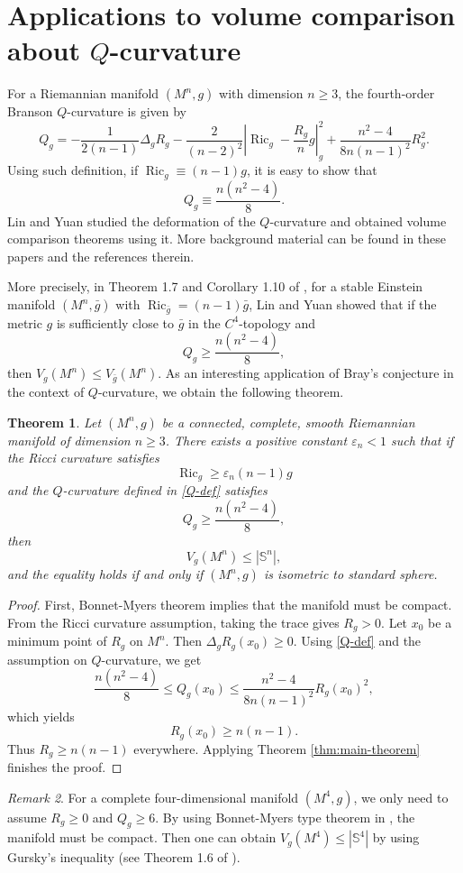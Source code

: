 \documentclass[11pt, reqno]{amsart}
\numberwithin{equation}{section}
\newtheorem{theorem}{Theorem}[section]
\theoremstyle{remark}
\newtheorem{remark}[theorem]{Remark}
\begin{document}
\section{Applications to  volume comparison about $Q$-curvature}\label{sec:application}


For a Riemannian manifold $(M^n,g)$ with dimension $n\geq 3$, the fourth-order Branson $Q$-curvature is given by
\begin{equation}\label{Q-def}
    Q_g=-\frac{1}{2(n-1)}\Delta_gR_g-\frac{2}{(n-2)^2}\left|\operatorname{Ric}_g-\frac{R_g}{n}g\right|_g^2+\frac{n^2-4}{8n(n-1)^2}R_g^2.
\end{equation}
Using such definition, if $\operatorname{Ric}_g\equiv (n-1)g$, it is easy to show that
$$
Q_g\equiv \frac{n(n^2-4)}{8}.
$$
Lin and Yuan \cite{LinYuan1,LinYuan2} studied the deformation of the $Q$-curvature and obtained volume comparison theorems using it. More background material can be found in these papers and the references therein.

More precisely, in Theorem 1.7 and Corollary 1.10 of \cite{LinYuan2}, for a stable Einstein manifold $(M^n,\bar g)$ with $\operatorname{Ric}_{\bar g}=(n-1)\bar g$, Lin and Yuan showed that if the metric $g$ is sufficiently close to $\bar g$ in the $C^4$-topology and
$$
Q_g\geq \frac{n(n^2-4)}{8},
$$
then $V_g(M^n)\leq V_{\bar g}(M^n)$. As an interesting application of Bray's conjecture in the context of $Q$-curvature, we obtain the following theorem.

\begin{theorem}
Let $(M^n,g)$ be a connected, complete, smooth Riemannian manifold of dimension $n\geq 3$. There exists a positive constant $\varepsilon_n<1$ such that if the Ricci curvature satisfies
$$
\operatorname{Ric}_g\geq \varepsilon_n (n-1)g
$$
and the $Q$-curvature defined in \eqref{Q-def} satisfies
$$
Q_g\geq \frac{n(n^2-4)}{8},
$$
then
$$
V_g(M^n)\leq |\mathbb{S}^n|,
$$
and the equality holds if and only if $(M^n, g)$ is isometric to standard sphere.
\end{theorem}

\begin{proof}
First, Bonnet-Myers theorem implies that the manifold must be compact.
From the Ricci curvature assumption, taking the trace gives $R_g>0$. Let $x_0$ be a minimum point of $R_g$ on $M^n$. Then $\Delta_g R_g(x_0)\geq 0$. Using \eqref{Q-def} and the assumption on $Q$-curvature, we get
$$
\frac{n(n^2-4)}{8}\leq Q_g(x_0)\leq \frac{n^2-4}{8n(n-1)^2}R_g(x_0)^2,
$$
which yields
$$
R_g(x_0)\geq n(n-1).
$$
Thus $R_g\geq n(n-1)$ everywhere. Applying Theorem \ref{thm:main-theorem} finishes the proof.
\end{proof}

\begin{remark}
For a complete four-dimensional manifold $(M^4,g)$, we only need to assume $R_g\geq 0$ and $Q_g\geq 6$.  By using Bonnet-Myers type theorem in \cite[Theorem 1.1]{jiangliwang}, the manifold must be compact. Then one can obtain $V_g(M^4)\leq |\mathbb{S}^4|$ by using Gursky's inequality \cite{Gursky} (see Theorem 1.6 of \cite{liwei}).
\end{remark}
    







\end{document}
